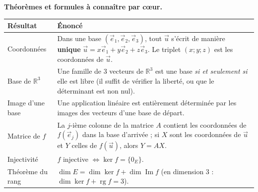 \documentclass[11pt]{article}
\begin{document}
\begin{aretenir}
\textbf{Théorèmes et formules à connaître par cœur.}
\begin{center}
\begin{tabularx}{\linewidth}{|l|X|}
\hline
\rowcolor{popblueL} \textbf{Résultat} & \textbf{Énoncé} \\
\hline
Coordonnées & Dans une base $(\vec{e}_1,\vec{e}_2,\vec{e}_3)$, tout $\vec{u}$ s'écrit de manière \textbf{unique} $\vec{u}=x\vec{e}_1+y\vec{e}_2+z\vec{e}_3$. Le triplet $(x;y;z)$ est les coordonnées de $\vec{u}$. \\
\hline
Base de $\mathbb{R}^3$ & Une famille de 3 vecteurs de $\mathbb{R}^3$ est une base \emph{si et seulement si} elle est libre (il suffit de vérifier la liberté, ou que le déterminant est non nul). \\
\hline
Image d'une base & Une application linéaire est entièrement déterminée par les images des vecteurs d'une base de départ. \\
\hline
Matrice de $f$ & La $j$-ième colonne de la matrice $A$ contient les coordonnées de $f(\vec{e}_j)$ dans la base d'arrivée ; si $X$ sont les coordonnées de $\vec{u}$ et $Y$ celles de $f(\vec{u})$, alors $Y=AX$. \\
\hline
Injectivité & $f$ injective $\iff \ker f=\{0_E\}$. \\
\hline
Théorème du rang & $\dim E=\dim\ker f+\dim\operatorname{Im}f$ (en dimension 3 : $\dim\ker f+\operatorname{rg} f=3$). \\
\hline
\end{tabularx}
\end{center}


\end{aretenir}
\end{document}
